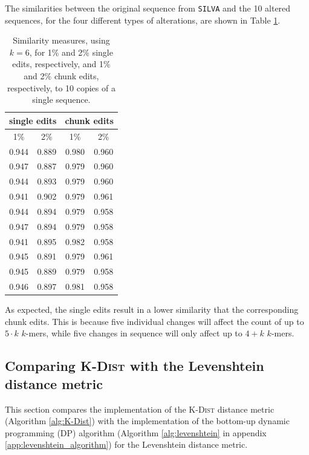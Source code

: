 The similarities between the original sequence from \texttt{SILVA} and the 10
altered sequences, for the four different types of alterations, are shown in
Table \ref{tab:altered_seqs_similarities}.

\begin{table}[H]
  \centering
  \begin{tabular}{c|c||c|c}
    \multicolumn{2}{c||}{single edits}  & \multicolumn{2}{c}{chunk edits} \\
    \hline\hline
    1\%   &   2\%                   &   1\%   &   2\% \\
    \hline
    0.944   & 0.889                     & 0.980     & 0.960 \\
    0.947   & 0.887                     & 0.979     & 0.960 \\
    0.944   & 0.893                     & 0.979     & 0.960 \\
    0.941   & 0.902                     & 0.979     & 0.961 \\
    0.944   & 0.894                     & 0.979     & 0.958 \\
    0.947   & 0.894                     & 0.979     & 0.958 \\
    0.941   & 0.895                     & 0.982     & 0.958 \\
    0.945   & 0.891                     & 0.979     & 0.961 \\
    0.945   & 0.889                     & 0.979     & 0.958 \\
    0.946   & 0.897                     & 0.981     & 0.958
  \end{tabular}
  \caption{Similarity measures, using $k=6$, for 1\% and 2\% single edits,
    respectively, and 1\% and 2\% chunk edits, respectively, to 10 copies of a
    single sequence.}
  \label{tab:altered_seqs_similarities}
\end{table}

As expected, the single edits result in a lower similarity that the
corresponding chunk edits. This is because five individual changes will affect
the count of up to $5 \cdot k$ $k$-mers, while five changes in sequence will
only affect up to $4+k$ $k$-mers.


\subsection{Comparing \textsc{K-Dist} with the Levenshtein distance metric}
\label{sec:kdist_vs_levenshtein}

This section compares the implementation of the \textsc{K-Dist} distance metric
(Algorithm \ref{alg:K-Dist}) with the implementation of the bottom-up dynamic
programming (DP) algorithm (Algorithm \ref{alg:levenshtein} in appendix
\ref{app:levenshtein_algorithm}) for the Levenshtein distance metric.

